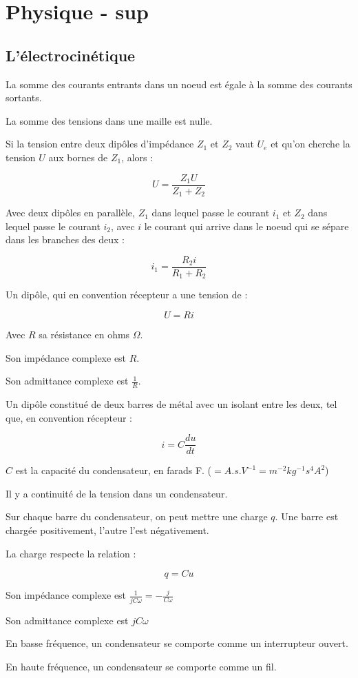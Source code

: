 \documentclass[a4paper,12pt]{book}
\newcommand{\Def}[2]{\begin{tcolorbox}[colback=white,colframe=red!10!green!20!blue!75!, title=Définition : #1]#2\end{tcolorbox}}
\newcommand{\Thr}[2]{\begin{tcolorbox}[sharp corners, colback=white,colframe=red!10!blue!30!green!75!, title=Théorème : #1]#2\end{tcolorbox}}
\begin{document}
\chapter{Physique - sup}
\section{L'électrocinétique}
\Thr{Loi des noeuds}{La somme des courants entrants dans un noeud est égale à la somme des courants sortants.}
\Thr{Loi des mailles}{La somme des tensions dans une maille est nulle.}
\Thr{Pont diviseur de tension}{Si la tension entre deux dipôles d'impédance $Z_1$ et $Z_2$ vaut $U_e$ et qu'on cherche la tension $U$ aux bornes de $Z_1$, alors :
\par $$U =\frac{Z_1U}{Z_1+Z_2}$$}
\Thr{Pont diviseur de courant}{Avec deux dipôles en parallèle, $Z_1$ dans lequel passe le courant $i_1$ et $Z_2$ dans lequel passe le courant $i_2$, avec $i$ le courant qui arrive dans le noeud qui se sépare dans les branches des deux :
\par $$i_1 =\dfrac{R_2i}{R_1+R_2}$$}
\Def{La résistance}{Un dipôle, qui en convention récepteur a une tension de :
\par $$U = Ri$$
\par Avec $R$ sa résistance en ohms $\Omega$.
\par Son impédance complexe est $R$.
\par Son admittance complexe est $\frac{1}{R}$.}
\Def{Le condensateur}{Un dipôle constitué de deux barres de métal avec un isolant entre les deux, tel que, en convention récepteur :
\par $$i = C\dfrac{d u}{dt}$$
\par $C$ est la capacité du condensateur, en farads F. ($=A.s.V^{-1}=m^{-2}kg^{-1}s^4A^2$)
\par Il y a continuité de la tension dans un condensateur.
\par Sur chaque barre du condensateur, on peut mettre une charge $q$. Une barre est chargée positivement, l'autre l'est négativement.
\par La charge respecte la relation :
\par $$q = Cu$$
\par Son impédance complexe est $\frac{1}{jC\omega}=-\frac{j}{C\omega}$
\par Son admittance complexe est $jC\omega$
\par En basse fréquence, un condensateur se comporte comme un interrupteur ouvert.
\par En haute fréquence, un condensateur se comporte comme un fil.}
\end{document}
